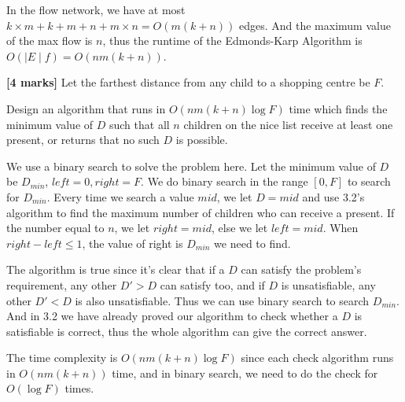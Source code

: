 \documentclass{article}
\begin{document}
\begin{Question}
\begin{answer}
In the flow network, we have at most $k\times m + k + m + n + m \times n =O(m(k+n))$ edges. And the maximum value of the max flow is $n$, thus the runtime of the Edmonds-Karp Algorithm is $O(\mid E\mid f) = O(nm(k+n))$.  

\end{answer}

\begin{Subquestion}
\textbf{[4 marks]} 
Let the farthest distance from any child to a shopping centre be $F$.

Design an algorithm that runs in $O(nm(k+n)\log{F})$ time which finds the minimum value of $D$ such that all $n$ children on the nice list receive at least one present, or returns that no such $D$ is possible.

\begin{answer}
We use a binary search to solve the problem here. Let the minimum value of $D$ be $D_{min}$, $left = 0, right = F$. We do binary search in the range $[0,F]$ to search for $D_{min}$. 
Every time we search a value $mid$, we let $D=mid$ and use 3.2's algorithm to find the maximum number of children who 
can receive a present. If the number equal to $n$, we let $right = mid$, else we let $left = mid$. When $right - left \le 1$, the value of right 
is $D_{min}$ we need to find.

The algorithm is true since it's clear that if a $D$ can satisfy the problem's requirement, any other $D' >D$ can satisfy too, and if $D$ is unsatisfiable, any other $D' < D$ is also unsatisfiable. Thus we can use binary search to search $D_{min}$.
And in 3.2 we have already proved our algorithm to check whether a $D$ is satisfiable is correct, thus the whole algorithm can give the correct answer.

The time complexity is $O(nm(k+n)\log F)$ since each check algorithm runs in $O(nm(k+n))$ time, and in binary search, we need to do the check for $O(\log F)$ times.
\end{answer}

\end{Subquestion}

\end{Question}
\end{document}
